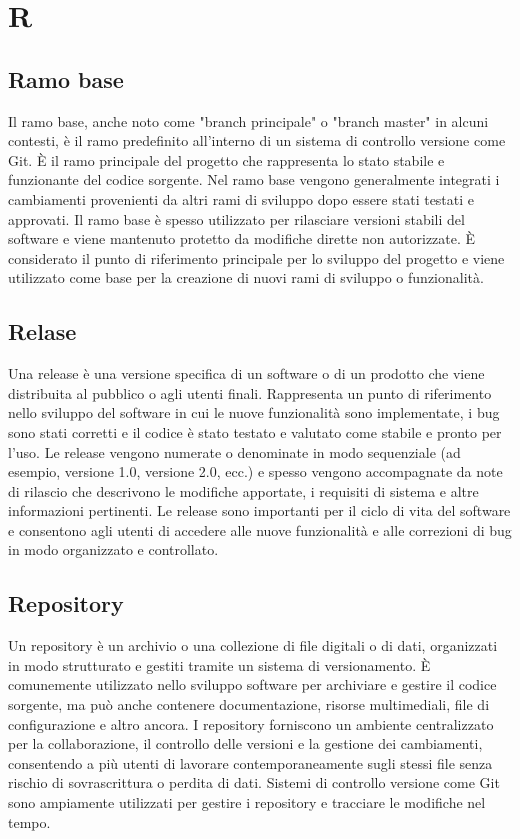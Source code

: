 \section{R}

\vspace{2em}
\subsection*{Ramo base}
Il ramo base, anche noto come "branch principale" o "branch master" in alcuni contesti, è il ramo predefinito all'interno di un sistema di controllo versione come Git. È il ramo principale del progetto che rappresenta lo stato stabile e funzionante del codice sorgente. Nel ramo base vengono generalmente integrati i cambiamenti provenienti da altri rami di sviluppo dopo essere stati testati e approvati. Il ramo base è spesso utilizzato per rilasciare versioni stabili del software e viene mantenuto protetto da modifiche dirette non autorizzate. È considerato il punto di riferimento principale per lo sviluppo del progetto e viene utilizzato come base per la creazione di nuovi rami di sviluppo o funzionalità.

\vspace{2em}
\subsection*{Relase}
Una release è una versione specifica di un software o di un prodotto che viene distribuita al pubblico o agli utenti finali. Rappresenta un punto di riferimento nello sviluppo del software in cui le nuove funzionalità sono implementate, i bug sono stati corretti e il codice è stato testato e valutato come stabile e pronto per l'uso. Le release vengono numerate o denominate in modo sequenziale (ad esempio, versione 1.0, versione 2.0, ecc.) e spesso vengono accompagnate da note di rilascio che descrivono le modifiche apportate, i requisiti di sistema e altre informazioni pertinenti. Le release sono importanti per il ciclo di vita del software e consentono agli utenti di accedere alle nuove funzionalità e alle correzioni di bug in modo organizzato e controllato.

\vspace{2em}
\subsection*{Repository}
Un repository è un archivio o una collezione di file digitali o di dati, organizzati in modo strutturato e gestiti tramite un sistema di versionamento. È comunemente utilizzato nello sviluppo software per archiviare e gestire il codice sorgente, ma può anche contenere documentazione, risorse multimediali, file di configurazione e altro ancora. I repository forniscono un ambiente centralizzato per la collaborazione, il controllo delle versioni e la gestione dei cambiamenti, consentendo a più utenti di lavorare contemporaneamente sugli stessi file senza rischio di sovrascrittura o perdita di dati. Sistemi di controllo versione come Git sono ampiamente utilizzati per gestire i repository e tracciare le modifiche nel tempo.

